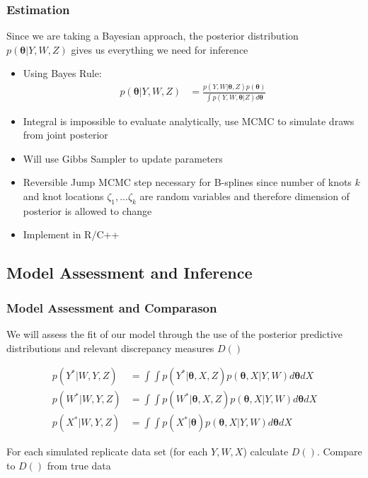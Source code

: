 \documentclass[handout]{beamer}\usepackage[]{graphicx}\usepackage[]{color}
\begin{document}
\begin{frame}
\frametitle{Estimation}
Since we are taking a Bayesian approach, the posterior distribution $p(\boldsymbol{\theta}|Y,W,Z)$ gives us everything we need for inference

\begin{itemize}
\item
Using Bayes Rule: 
\begin{align}
p(\boldsymbol{\theta}|Y,W,Z) &= \frac{p(Y,W|\boldsymbol{\theta},Z) p(\boldsymbol{\theta})}{\int p(Y,W,\boldsymbol{\theta}|Z) d\boldsymbol{\theta}}
\end{align}
\item 
Integral is impossible to evaluate analytically, use MCMC to simulate draws from joint posterior
\item
Will use Gibbs Sampler to update parameters 
\item
Reversible Jump MCMC step necessary for B-splines since number of knots $k$ and knot locations $\zeta_1,...\zeta_k$ are random variables and therefore dimension of posterior is allowed to change
\item
Implement in R/C++
\end{itemize}

\end{frame}

\subsection{Model Assessment and Inference}

\begin{frame}
\frametitle{Model Assessment and Comparason}
We will assess the fit of our model through the use of the posterior predictive distributions and relevant discrepancy measures $D()$

\begin{align}
  \label{ypostpred}
  p(Y^*|W,Y,Z) &= \int \int p(Y^*|\boldsymbol{\theta},X,Z) p(\boldsymbol{\theta}, X|Y,W) d\boldsymbol{\theta} dX \\
  \label{wpostpred}
  p(W^*|W,Y,Z) &= \int \int p(W^*|\boldsymbol{\theta},X,Z) p(\boldsymbol{\theta}, X|Y,W) d\boldsymbol{\theta} dX \\
  \label{xpostpred}
  p(X^*|W,Y,Z) &= \int \int p(X^*|\boldsymbol{\theta}) p(\boldsymbol{\theta}, X|Y,W) d\boldsymbol{\theta} dX
\end{align}

For each simulated replicate data set (for each $Y,W,X$) calculate $D()$. Compare to $D()$ from true data

\end{frame}
\end{document}
